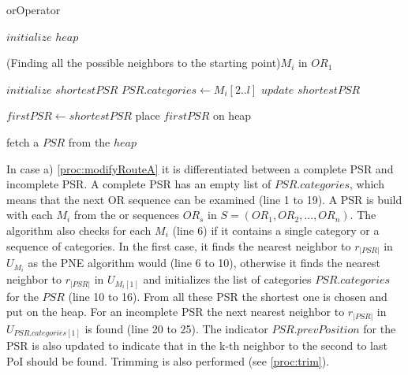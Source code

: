 \begin{algorithm}[H]
	\label{alg:or}
	\caption{orOperator}
	
	\BlankLine
	
	$initialize$ $heap$\; 
	
	\ForEach(Finding all the possible neighbors to the starting point){$M_i$ in $OR_1$}{
		$initialize$ $shortestPSR$\;
		{
			\;
			$PSR.categories \leftarrow M_i[2..l]$\;
			$update$ $shortestPSR$\;
		}	
		
	}
	$firstPSR \leftarrow shortestPSR$\;
	place $firstPSR$ on heap\;
	
	\BlankLine
	
	
	fetch a $PSR$ from the $heap$\;

\end{algorithm}

In case a) \ref{proc:modifyRouteA} it is differentiated between a complete PSR and incomplete PSR. 
A complete PSR has an empty list of $PSR.categories$, which means that the next OR sequence can be examined (line 1 to 19). A PSR is build with each $M_i$ from the or sequences $OR_s$ in $S = (OR_1, OR_2, ..., OR_n)$. The algorithm also checks for each $M_i$ (line 6) if it contains a single category or a sequence of categories. In the first case, it finds the nearest neighbor to $r_{|PSR|}$ in $U_{M_{i}}$ as the PNE algorithm would (line 6 to 10), otherwise it finds the nearest neighbor to $r_{|PSR|}$ in $U_{M_i[1]}$ and initializes the list of categories $PSR.categories$ for the $PSR$ (line 10 to 16). From all these PSR the shortest one is chosen and put on the heap.
For an incomplete PSR the next nearest neighbor to $r_{|PSR|}$ in $U_{PSR.categories[1]}$ is found (line 20 to 25). The indicator $PSR.prevPosition$ for the PSR is also updated to indicate that in  the k-th neighbor to the second to last PoI should be found.
Trimming is also performed (see \ref{proc:trim}). \newline


